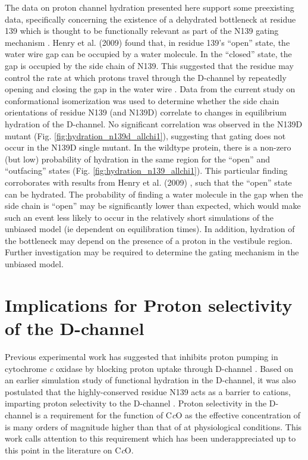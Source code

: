 The data on proton channel hydration presented here support some preexisting data, specifically concerning the existence of a dehydrated bottleneck at residue 139 which is thought to be functionally relevant as part of the N139 gating mechanism \cite{Henry:2009p4543}. Henry et al. (2009) found that, in residue 139's ``open'' state, the water wire gap can be occupied by a water molecule. In the ``closed'' state, the gap is occupied by the side chain of N139. This suggested that the residue may control the rate at which protons travel through the D-channel by repeatedly opening and closing the gap in the water wire \cite{Henry:2009p4543}. Data from the current study on conformational isomerization was used to determine whether the side chain orientations of residue N139 (and N139D) correlate to changes in equilibrium hydration of the D-channel. No significant correlation was observed in the N139D mutant (Fig. \ref{fig:hydration_n139d_allchi1}), suggesting that gating does not occur in the N139D single mutant. In the wildtype protein, there is a non-zero (but low) probability of hydration in the same region for the ``open'' and ``outfacing'' states (Fig. \ref{fig:hydration_n139_allchi1}). This particular finding corroborates with results from Henry et al. (2009) \cite{Henry:2009p4543}, such that the ``open'' state can be hydrated. The probability of finding a water molecule in the gap when the side chain is ``open'' may be significantly lower than expected, which would make such an event less likely to occur in the relatively short simulations of the unbiased model (ie dependent on equilibration times). In addition, hydration of the bottleneck may depend on the presence of a proton in the vestibule region. Further investigation may be required to determine the gating mechanism in the unbiased model.

\section{Implications for Proton selectivity of the D-channel}

Previous experimental work has suggested that  inhibits proton pumping in cytochrome \emph{c} oxidase by blocking proton uptake through D-channel \cite{Kannt:2001p8408,Aagaard:2002p8410,Kuznetsova:2005p8380,Faxen:2006p8398,Francia:2007p8388,Qin:2007p8387,Muramoto:2007p8383}. Based on an earlier simulation study of functional hydration in the D-channel, it was also postulated that the highly-conserved residue N139 acts as a barrier to cations, imparting proton selectivity to the D-channel \cite{Henry:2009p4543}. Proton selectivity in the D-channel is a requirement for the function of C\emph{c}O as the effective concentration of  is many orders of magnitude higher than that of  at physiological conditions. This work calls attention to this requirement which has been underappreciated up to this point in the literature on C\emph{c}O. 

